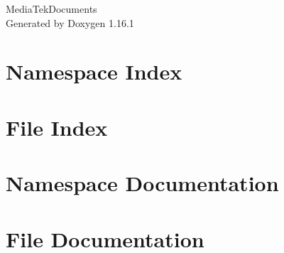 \documentclass[twoside]{book}
\newcommand{\+}{\discretionary{\mbox{\scriptsize$\hookleftarrow$}}{}{}}
\newcommand{\clearemptydoublepage}{%
    \newpage{\pagestyle{empty}\cleardoublepage}%
  }
\begin{document}
  \raggedbottom
    \hypersetup{pageanchor=false,
                bookmarksnumbered=true,
                pdfencoding=unicode
               }
  \begin{titlepage}
  \vspace*{7cm}
  \begin{center}%
  {\Large Media\+Tek\+Documents}\\
  \vspace*{1cm}
  {\large Generated by Doxygen 1.16.1}\\
  \end{center}
  \end{titlepage}
  \clearemptydoublepage
  \tableofcontents
  \clearemptydoublepage
  \hypersetup{pageanchor=true}

\chapter{Namespace Index}

\chapter{File Index}

\chapter{Namespace Documentation}

\chapter{File Documentation}


  \backmatter
  \newpage
  \clearemptydoublepage
  \printindex
\end{document}
